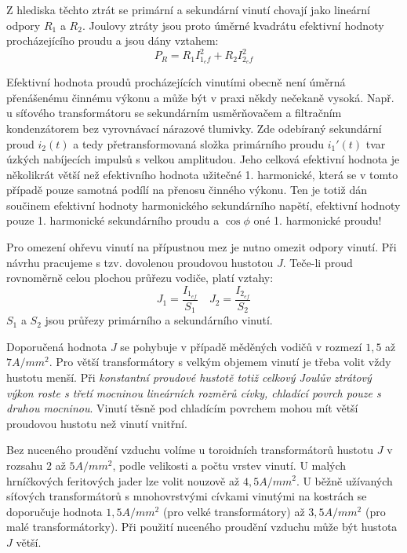       Z hlediska těchto ztrát se primární a sekundární vinutí chovají jako lineární odpory $R_1$ a 
      $R_2$. Joulovy ztráty jsou proto úměrné kvadrátu efektivní hodnoty procházejícího proudu a 
      jsou dány vztahem:
      \begin{equation}\label{es_joul_loss}
        P_R= R_1 I_{1_ef}^2 + R_2 I_{2_ef}^2
      \end{equation}

      Efektivní hodnota proudů procházejících vinutími obecně není úměrná přenášenému činnému 
      výkonu a může být v praxi někdy nečekaně vysoká. Např. u síťového transformátoru se 
      sekundárním usměrňovačem a filtračním kondenzátorem bez vyrovnávací nárazové tlumivky. Zde 
      odebíraný sekundární proud $i_2(t)$ a tedy přetransformovaná složka primárního proudu 
      $i_1'(t)$ tvar úzkých nabíjecích impulsů s velkou amplitudou. Jeho celková efektivní hodnota 
      je několikrát větší než efektivního hodnota užitečné 1. harmonické, která se v tomto případě 
      pouze samotná podílí na přenosu činného výkonu. Ten je totiž dán součinem efektivní hodnoty 
      harmonického sekundárního napětí, efektivní hodnoty pouze 1. harmonické sekundárního proudu a 
      $\cos\phi$ oné 1. harmonické proudu!

      Pro omezení ohřevu vinutí na přípustnou mez je nutno omezit odpory vinutí. Při návrhu 
      pracujeme s tzv. dovolenou proudovou hustotou $J$. Teče-li proud rovno\-měr\-ně celou plochou 
      průřezu vodiče, platí vztahy:
      \begin{equation}\label{es_proud_hustota}
        J_1=\frac{I_{1_{ef}}}{S_1} \quad J_2=\frac{I_{2_{ef}}}{S_2}
      \end{equation}
      $S_1$ a $S_2$ jsou průřezy primárního  a sekundárního vinutí.

      Doporučená hodnota $J$ se pohybuje v případě měděných vodičů v rozmezí $1,5$ až $7 A/mm^2$. 
      Pro větší transformátory s velkým objemem vinutí je třeba volit vždy hustotu menší. Při 
      \emph{konstantní proudové hustotě totiž celkový Joulův ztrátový výkon roste s třetí mocninou 
      lineárních rozměrů cívky, chladící povrch pouze s druhou mocninou}. Vinutí těsně pod 
      chladícím povrchem mohou mít větší proudovou hustotu než vinutí vnitřní.

      Bez nuceného proudění vzduchu volíme u toroidních transformátorů hustotu $J$ v rozsahu $2$ až
      $5 A/mm^2$, podle velikosti a počtu vrstev vinutí. U malých hrníčkových feritových jader lze 
      volit nouzově až $4,5 A/mm^2$. U běžně užívaných síťových transformátorů s mnohovrstvými 
      cívkami vinutými na kostrách se doporučuje hodnota $1,5 A/mm^2$ (pro velké transformátory) až 
      $3,5 A/mm^2$ (pro malé transformátorky). Při použití nuceného proudění vzduchu může být 
      hustota $J$ větší.

